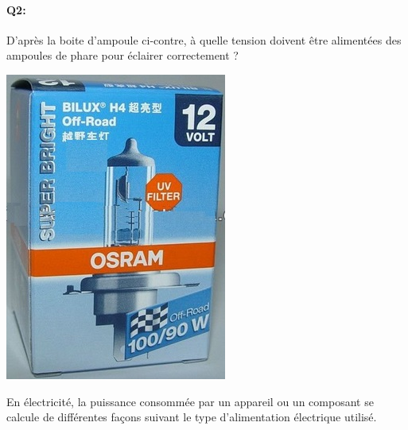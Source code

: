 \documentclass{article}
\begin{document}
\vspace{1em}

\begin{minipage}[b]{0.68\linewidth}
\paragraph{Q2:}
D’après la boite d’ampoule ci-contre, à quelle tension doivent être alimentées des ampoules de phare pour éclairer correctement ?
	\vspace{5em}
\end{minipage}
\hfill
\begin{minipage}[b]{0.28\linewidth}
	\centering
	\includegraphics[width=.8\linewidth]{./figures/phare2.png}
\end{minipage}

\newpage

En électricité, la puissance consommée par un appareil ou un composant se calcule de différentes façons
suivant le type d’alimentation électrique utilisé.\\
\end{document}
